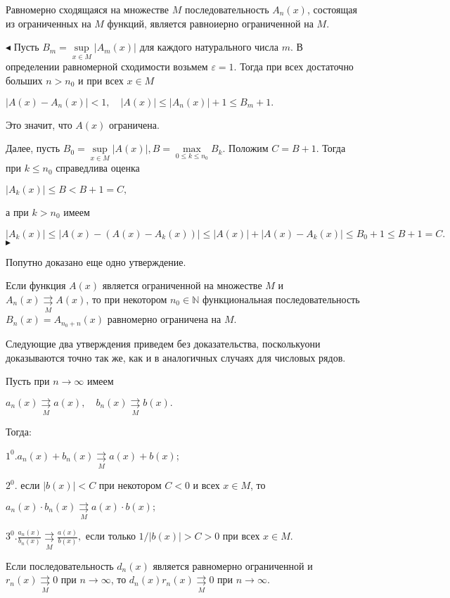 \begin{approval}Равномерно сходящаяся на множестве $M$ последовательность $A_n(x)$, состоящая из ограниченных на $M$ функций, является равноиерно ограниченной на $M$.\end{approval}
$\blacktriangleleft$ Пусть $B_m = \mathop{sup}\limits_{x\in M}|A_m(x)|$ для каждого натурального числа $m$. В определении равномерной сходимости возьмем $\varepsilon=1$. Тогда при всех достаточно больших $n>n_0$ и при всех $x\in M$
\begin{center}$|A(x)-A_n(x)|<1,\quad |A(x)|\le |A_n(x)|+1\le B_m+1.$
\end{center}
Это значит, что $A(x)$ ограничена.

Далее, пусть $B_0=\mathop{sup}\limits_{x\in M}|A(x)|,B= \mathop{max}\limits_{0\le k \le n_0}B_k$. Положим $C=B+1$. Тогда при $k \le n_0$ справедлива оценка
\begin{center}$|A_k(x)|\le B<B+1=C,$
\end{center}
а при $k>n_0$ имеем
\begin{center}$|A_k(x)|\le|A(x)-(A(x)-A_k(x))|\le|A(x)|+|A(x)-A_k(x)|\le B_0+1\le B+1=C.$ $\blacktriangleright$
\end{center}
Попутно доказано еще одно утверждение.\smallskip

\begin{approval} Если функция $A(x)$ является ограниченной на множестве $M$ и $A_n(x)\mathop{\rightrightarrows}\limits_{M} A(x)$, то при некотором $n_0\in \mathbb{N}$ функциональная последовательность $B_n(x)=A_{n_0+n}(x)$ равномерно ограничена на $M$.\end{approval}\smallskip

Следующие два утверждения приведем без доказательства, посколькуони доказываются точно так же, как и в аналогичных случаях для числовых рядов.\smallskip

\begin{approval}Пусть при $n\to \infty$ имеем
\begin{center}$a_n(x)\mathop{\rightrightarrows}\limits_{M}a(x), \quad b_n(x)\mathop{\rightrightarrows}\limits_{M}b(x).$
\end{center}
Тогда:

$1^0.a_n(x)+b_n(x)\mathop{\rightrightarrows}\limits_{M}a(x)+b(x)$;

$2^0.$ если $|b(x)|<C$ при некотором $C<0$ и всех $x \in M$, то

\begin{center}$a_n(x)\cdot b_n(x)\mathop{\rightrightarrows}\limits_{M}a(x)\cdot b(x);$
\end{center}

$3^0.\frac{a_n(x)}{b_n(x)}\mathop{\rightrightarrows}\limits_{M}\frac{a(x)}{b(x)},$ если только $1/|b(x)|>C>0$ при всех $x\in M.$\end{approval}

\begin{approval}Если последовательность $d_n(x)$ является равномерно ограниченной и $r_n(x)\mathop{\rightrightarrows}\limits_{M}0$ при $n\to \infty$, то $d_n(x)r_n(x)\mathop{\rightrightarrows}\limits_{M}0$ при $n\to \infty$.\end{approval}

